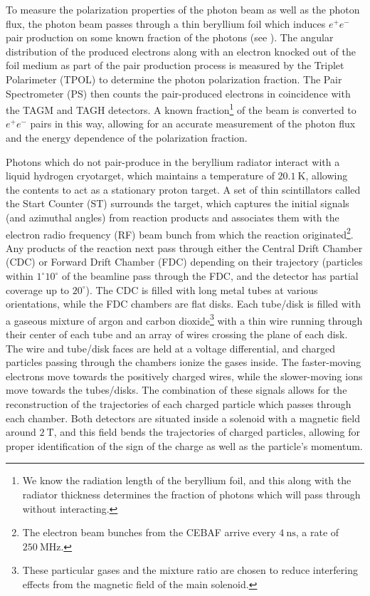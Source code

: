 To measure the polarization properties of the photon beam as well as the photon flux, the photon beam passes through a thin beryllium foil which induces $e^+e^-$ pair production on some known fraction of the photons (see ). The angular distribution of the produced electrons along with an electron knocked out of the foil medium as part of the pair production process is measured by the Triplet Polarimeter (TPOL) to determine the photon polarization fraction. The Pair Spectrometer (PS) then counts the pair-produced electrons in coincidence with the TAGM and TAGH detectors. A known fraction\footnote{We know the radiation length of the beryllium foil, and this along with the radiator thickness determines the fraction of photons which will pass through without interacting.} of the beam is converted to $e^+e^-$ pairs in this way, allowing for an accurate measurement of the photon flux and the energy dependence of the polarization fraction.

Photons which do not pair-produce in the beryllium radiator interact with a liquid hydrogen cryotarget, which maintains a temperature of $\SI{20.1}{\K}$, allowing the contents to act as a stationary proton target. A set of thin scintillators called the Start Counter (ST) surrounds the target, which captures the initial signals (and azimuthal angles) from reaction products and associates them with the electron radio frequency (RF) beam bunch from which the reaction originated\footnote{The electron beam bunches from the CEBAF arrive every $\SI{4}{\nano\s}$, a rate of $\SI{250}{\mega\hertz}$.}. Any products of the reaction next pass through either the Central Drift Chamber (CDC) or Forward Drift Chamber (FDC) depending on their trajectory (particles within $1^{\circ}$\textendash$10^{\circ}$ of the beamline pass through the FDC, and the detector has partial coverage up to $20^{\circ}$). The CDC is filled with long metal tubes at various orientations, while the FDC chambers are flat disks. Each tube/disk is filled with a gaseous mixture of argon and carbon dioxide\footnote{These particular gases and the mixture ratio are chosen to reduce interfering effects from the magnetic field of the main solenoid.} with a thin wire running through their center of each tube and an array of wires crossing the plane of each disk. The wire and tube/disk faces are held at a voltage differential, and charged particles passing through the chambers ionize the gases inside. The faster-moving electrons move towards the positively charged wires, while the slower-moving ions move towards the tubes/disks. The combination of these signals allows for the reconstruction of the trajectories of each charged particle which passes through each chamber. Both detectors are situated inside a solenoid with a magnetic field around $\SI{2}{\tesla}$, and this field bends the trajectories of charged particles, allowing for proper identification of the sign of the charge as well as the particle's momentum.

